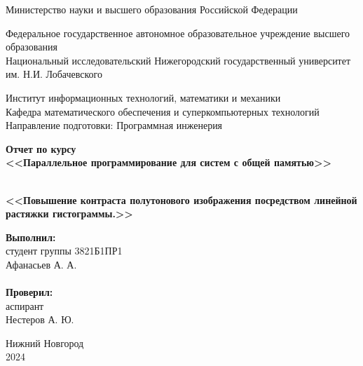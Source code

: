 \documentclass{report}
\begin{document}
\begin{titlepage}

\begin{center}
Министерство науки и высшего образования Российской Федерации
\end{center}

\begin{center}
Федеральное государственное автономное образовательное учреждение высшего образования \\
Национальный исследовательский Нижегородский государственный университет \newline им. Н.И. Лобачевского
\end{center}

\begin{center}
Институт информационных технологий, математики и механики \\
Кафедра математического обеспечения и суперкомпьютерных технологий \\
Направление подготовки: Программная инженерия
\end{center}

\begin{center}
\textbf{Отчет по курсу \\
\vspace{0.5em}
<<Параллельное программирование для систем с общей памятью>>} \\
\end{center}

\vspace{4em}

\begin{center}
\textbf{ \\
\vspace{0.5em}
<<Повышение контраста полутонового изображения посредством линейной растяжки гистограммы.>>} \\
\end{center}

\vspace{4em}

\newbox{\lbox}
\newlength{\maxl}
\setlength{\maxl}{\wd\lbox}
\hfill\parbox{7cm}{
\hspace*{5cm}\hspace*{-5cm}\textbf{Выполнил:} \\ студент группы 3821Б1ПР1\\Афанасьев А. А.\\
\\
\hspace*{5cm}\hspace*{-5cm}\textbf{Проверил:}\\ аспирант\\Нестеров А. Ю.\\
}
\vspace{\fill}

\begin{center} Нижний Новгород \\ 2024 \end{center}

\end{titlepage}
\end{document}
